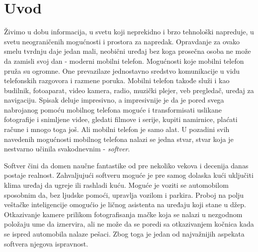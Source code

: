\documentclass[12pt,oneside]{memoir}
\begin{document}
\frontmatter
\naslovna
\komisija
\apstrakt


\tableofcontents*

\mainmatter

\chapter{Uvod}

Živimo u dobu informacija, u svetu koji neprekidno i brzo tehnološki napreduje, u svetu neograničenih mogućnosti i prostora za napredak. Opravdanje za ovako smelu tvrdnju daje jedan mali, neobični uređaj bez koga prosečna osoba ne može da zamisli svoj dan - moderni mobilni telefon. Mogućnosti koje mobilni telefon pruža su ogromne. One prevazilaze jednostavno sredstvo komunikacije u vidu telefonskih razgovora i razmene poruka. Mobilni telefon takođe služi i kao budilnik, fotoaparat, video kamera, radio, muzički plejer, veb pregledač, uređaj za navigaciju. Spisak deluje impresivno, a impresivnije je da je pored svega nabrojanog pomoću mobilnog telefona moguće i transformisati uslikane fotografije i snimljene videe, gledati filmove i serije, kupiti namirnice, plaćati račune i mnogo toga još. Ali mobilni telefon je samo alat. U pozadini svih navedenih mogućnosti mobilnog telefona nalazi se jedna stvar, stvar koja je nestvarno učinila svakodnevnim - \textit{softver}. 

Softver čini da domen naučne fantastike od pre nekoliko vekova i decenija danas postaje realnost. Zahvaljujući softveru moguće je pre samog dolaska kući uključiti klima uređaj da ugreje ili rashladi kuću. Moguće je voziti se automobilom sposobnim da, bez ljudske pomoći, upravlja vozilom i parkira. Proboj na polju veštačke inteligencije omogućio je ličnog asistenta na uređaju koji stane u džep. Otkazivanje kamere prilikom fotografisanja mačke koja se nalazi u nezgodnom položaju ume da iznervira, ali ne može da se poredi sa otkazivanjem kočnica kada se ispred automobila nalaze pešaci. Zbog toga je jedan od najvažnijih aspekata softvera njegova ispravnost. 
\end{document}
